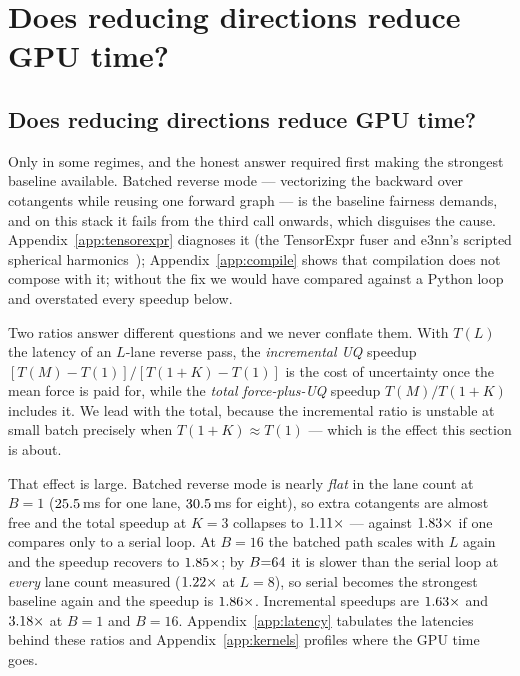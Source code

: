 \documentclass{article}
\begin{document}
\section{Does reducing directions reduce GPU time?}
\label{app:systems}
\subsection{Does reducing directions reduce GPU time?}
\label{sec:regime}
Only in some regimes, and the honest answer required first making the strongest baseline available.
Batched reverse mode --- vectorizing the backward over cotangents while reusing one forward graph ---
is the baseline fairness demands, and on this stack it fails from the third call onwards, which
disguises the cause. Appendix~\ref{app:tensorexpr} diagnoses it (the TensorExpr fuser and e3nn's
scripted spherical harmonics~\citep{e3nn}); Appendix~\ref{app:compile} shows
that compilation does not compose with it; without the fix we would have compared against a Python
loop and overstated every speedup below.

Two ratios answer different questions and we never conflate them. With $T(L)$ the latency of an
$L$-lane reverse pass, the \emph{incremental UQ} speedup $[T(M)-T(1)]/[T(1{+}K)-T(1)]$ is the cost
of uncertainty once the mean force is paid for, while the \emph{total force-plus-UQ} speedup
$T(M)/T(1{+}K)$ includes it. We lead with the total, because the incremental ratio is unstable at
small batch precisely when $T(1{+}K)\approx T(1)$ --- which is the effect this section is about.

That effect is large. Batched reverse mode is nearly \emph{flat} in the lane count at $B{=}1$
($25.5$\,ms for one lane, $30.5$\,ms for eight), so extra
cotangents are almost free and the total speedup at $K{=}3$ collapses to
$1.11\times$ --- against $1.83\times$ if one compares only to a
serial loop. At $B{=}16$ the batched path scales with $L$ again and the speedup recovers to
$1.85\times$; by $B{=}64{}$ it is slower than the serial loop
at \emph{every} lane count measured ($1.22\times$ at $L{=}8$), so serial becomes the
strongest baseline again and the speedup is $1.86\times$. Incremental
speedups are $1.63\times$ and $3.18\times$ at $B{=}1$ and
$B{=}16$. Appendix~\ref{app:latency} tabulates the latencies behind these ratios and
Appendix~\ref{app:kernels} profiles where the GPU time goes.
\end{document}
